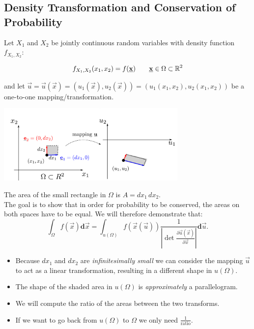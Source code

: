 \subsection{Density Transformation and Conservation of Probability}

Let $X_1$ and $X_2$ be jointly continuous random variables with 
density function $f_{X_1, X_2}$:

$$
f_{X_1, X_2}(x_1, x_2) = f(\underline{\mathbf{x}}) \qquad \underline{\mathbf{x}} \in \Omega \subset \mathbb{R}^2
$$

and let $\vec u = \vec u(\vec x) = ( u_1(\vec x), u_2(\vec x)) = ( u_1(x_1, x_2), u_2(x_1, x_2)) $ be a one-to-one mapping/transformation.

\includegraphics[width=0.7\textwidth]{img/u.pdf}

The area of the small rectangle in $\Omega$ is $A = dx_1\, dx_2$.\\

The goal is to show that in order for probability to be conserved, the areas on both spaces have to be equal. 
We will therefore demonstrate that:
$$
\int_{\Omega} f(\vec{x}) \mathbf{d}\vec{x}
=\int_{u(\Omega)} f({\vec x(\vec u)}) \frac{1}{\left|\det \frac{\partial \vec{u}(\vec{x})}{\partial \vec{x}} \right|} \mathbf{d}\vec{u}.
$$

\begin{itemize}
\item Because $dx_1$ and $dx_2$ are \emph{infinitesimally small} we can consider the mapping 
$\vec u$ to act as a linear transformation, resulting in a different shape in $u(\Omega)$. 
\item The shape of the shaded area in $u(\Omega)$ is \emph{approximately} a parallelogram.
\item We will compute the ratio of the areas between the two transforms.
\item If we want to go back from $u(\Omega)$ to $\Omega$ we only need $\frac{1}{\text{ratio}}$.
\end{itemize}

